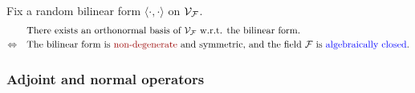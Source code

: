 %
\begin{theorem}
Fix a random bilinear form $\langle \cdot, \cdot \rangle$ on $\mathcal{V}_{\mathcal{F}}$.
%
\begin{align*}
    &\textnormal{There exists an orthonormal basis of } \VF \textnormal{ w.r.t. the bilinear form.} \\
    \Leftrightarrow \quad &\textnormal{The bilinear form is \textcolor{dred}{non-degenerate} and symmetric, and the field } \F \textnormal{ is \textcolor{blue}{algebraically closed}.}
\end{align*}
%
\end{theorem}


\subsubsection{Adjoint and normal operators}

